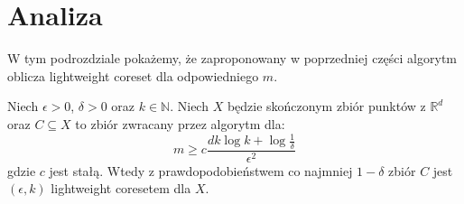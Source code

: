 \section{Analiza}

W tym podrozdziale pokażemy, że zaproponowany w poprzedniej części algorytm oblicza lightweight coreset dla odpowiedniego $m$.

\begin{thm}{\cite{bachem2017scalable}}
    Niech $\epsilon > 0$, $\delta > 0$ oraz $k \in \mathbb{N}$. 
    Niech $X$ będzie skończonym zbiór punktów z $\mathbb{R}^{d}$ oraz $C \subseteq X$ to zbiór zwracany przez algorytm dla:
    \begin{equation}
        m \geq c\frac{dk \log{k} + \log{\frac{1}{\delta}}}{\epsilon^2} 
    \end{equation}
    gdzie $c$ jest stałą. 
    Wtedy z prawdopodobieństwem co najmniej $1-\delta$ zbiór $C$ jest $(\epsilon, k)$ lightweight coresetem dla $X$.
\end{thm}


